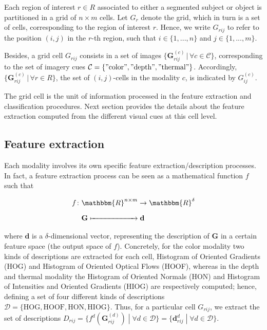 \documentclass[10pt,twocolumn,letterpaper]{article}
\begin{document}
Each region of interest $r \in R$ associated to either a segmented subject or object is partitioned in a grid of $n \times m$ cells. Let $G_r$ denote the grid, which in turn is a set of cells, corresponding to the region of interest $r$. Hence, we write $G_{rij}$ to refer to the position $(i,j)$ in the $r$-th region, such that $i \in \{ 1,...,n \}$ and $j \in \{ 1,...,m \}$. 

Besides, a grid cell $G_{rij}$ consists in a set of images $\{\mathbf{G}_{rij}^{(c)} \,|\, \forall{c} \in \mathcal{C}\}$, corresponding to the set of imagery cues $\mathcal{C} = \{\mathrm{"color"}, \mathrm{"depth"}, \mathrm{"thermal"}\}$. Accordingly, $\{\mathbf{G}_{rij}^{(c)} \,|\, \forall r \in R\}$, the set of $(i,j)$-cells in the modality $c$, is indicated by $G_{ij}^{(c)}$.

The grid cell is the unit of information processed in the feature extraction and classification procedures. Next section provides the details about the feature extraction computed from the different visual cues at this cell level.

\subsection{Feature extraction}
\label{ssec:feature extraction}

Each modality involves its own specific feature extraction/description processes. In fact, a feature extraction process can be seen as a mathematical function $f$ such that

\begin{align}
\begin{split}
f \colon & \mathbbm{R}^{n \times m} \to \mathbbm{R}^\delta \\
& \mathbf{G} \xmapsto{\phantom{\mathbbm{R}^{n \times m}}} \mathbf{d}
\end{split}
\end{align}

where $\mathbf{d}$ is a $\delta$-dimensional vector, representing the description of $\mathbf{G}$ in a certain feature space (the output space of $f$). Concretely, for the color modality two kinds of descriptions are extracted for each cell, Histogram of Oriented Gradients (HOG) and Histogram of Oriented Optical Flows (HOOF), whereas in the depth and thermal modality the Histogram of Oriented Normals (HON) and Histogram of Intensities and Oriented Gradients (HIOG) are respectively computed; hence, defining a set of four different kinds of descriptions $\mathcal{D} = \{\mathrm{HOG}, \mathrm{HOOF}, \mathrm{HON}, \mathrm{HIOG}\}$. Thus, for a particular cell $G_{rij}$, we extract the set of descriptions $D_{rij} = \{f^d(\mathbf{G}_{rij}^{(d)}) \;|\; \forall d \in \mathcal{D}\} = \{\mathbf{d}_{rij}^d \;|\; \forall d \in \mathcal{D}\}$.
\end{document}
